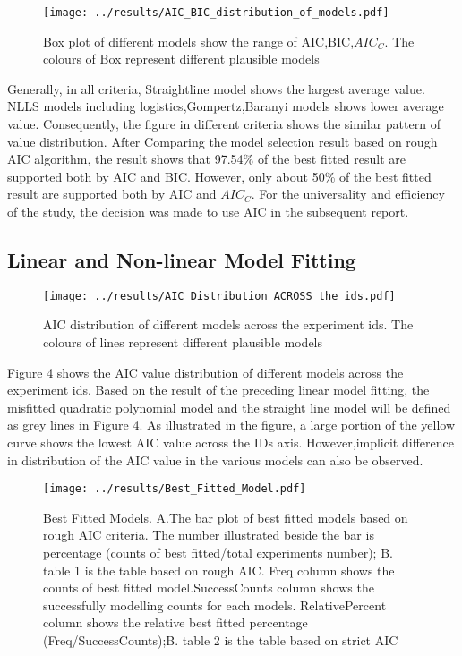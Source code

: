 \documentclass[11pt]{article}
\begin{document}
      \begin{figure}[H]
        \centering
        \texttt{[image: ../results/AIC\_BIC\_distribution\_of\_models.pdf]}
        \caption{Box plot of different models show the range of AIC,BIC,$AIC_C$. The colours of Box represent different plausible models}
      \end{figure}
  
      Generally, in all criteria, Straightline model shows the largest average value. NLLS models including logistics,Gompertz,Baranyi models shows lower average value. Consequently, the figure in different criteria shows the similar pattern of value distribution. After Comparing the model selection result based on rough AIC algorithm, the result shows that 97.54\% of the best fitted result are supported both by AIC and BIC. However, only about 50\% of the best fitted result are supported both by AIC and $AIC_C$. For the universality and efficiency of the study, the decision was made to use AIC in the subsequent report.
      
  \subsection{Linear and Non-linear Model Fitting}
      
  \begin{figure}[H]
        \centering
        \texttt{[image: ../results/AIC\_Distribution\_ACROSS\_the\_ids.pdf]}
        \caption{AIC distribution of different models across the experiment ids. The colours of lines represent different plausible models}
  \end{figure}
      
  Figure 4 shows the AIC value distribution of different models across the experiment ids. Based on the result of the preceding linear model fitting, the misfitted quadratic polynomial model and the straight line model will be defined as grey lines in Figure 4. As illustrated in the figure, a large portion of the yellow curve shows the lowest AIC value across the IDs axis. However,implicit difference in distribution of the AIC value in the various models can also be observed.
  
  \begin{figure}[H]
       \centering
       \texttt{[image: ../results/Best\_Fitted\_Model.pdf]}
       \caption{Best Fitted Models. A.The bar plot of best fitted models based on rough AIC criteria. The number illustrated beside the bar is percentage (counts of best fitted/total experiments number); B. table 1 is the table based on rough AIC. Freq column shows the counts of best fitted model.SuccessCounts column shows the successfully modelling counts for each models. RelativePercent column shows the relative best fitted percentage (Freq/SuccessCounts);B. table 2 is the table based on strict AIC}
  \end{figure}
  
\end{document}

